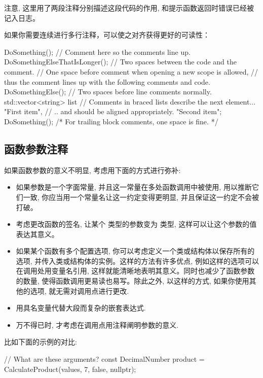 注意, 这里用了两段注释分别描述这段代码的作用, 和提示函数返回时错误已经被记入日志。

如果你需要连续进行多行注释，可以使之对齐获得更好的可读性：

\begin{cppcode}
DoSomething();                  // Comment here so the comments line up.
DoSomethingElseThatIsLonger();  // Two spaces between the code and the comment.
  { // One space before comment when opening a new scope is allowed,
    // thus the comment lines up with the following comments and code.
    DoSomethingElse();  // Two spaces before line comments normally.
  }
std::vector<string> list{
    // Comments in braced lists describe the next element...
    "First item",
    // .. and should be aligned appropriately.
    "Second item"};
DoSomething(); /* For trailing block comments, one space is fine. */
\end{cppcode}

\subsection{函数参数注释}

如果函数参数的意义不明显, 考虑用下面的方式进行弥补:

\begin{itemize}
  \item 如果参数是一个字面常量, 并且这一常量在多处函数调用中被使用, 用以推断它们一致, 你应当用一个常量名让这一约定变得更明显, 并且保证这一约定不会被打破。
  \item 考虑更改函数的签名, 让某个  类型的参数变为  类型, 这样可以让这个参数的值表达其意义。
  \item 如果某个函数有多个配置选项, 你可以考虑定义一个类或结构体以保存所有的选项, 并传入类或结构体的实例。这样的方法有许多优点, 例如这样的选项可以在调用处用变量名引用, 这样就能清晰地表明其意义。同时也减少了函数参数的数量, 使得函数调用更易读也易写。除此之外, 以这样的方式, 如果你使用其他的选项, 就无需对调用点进行更改.
  \item 用具名变量代替大段而复杂的嵌套表达式.
  \item 万不得已时, 才考虑在调用点用注释阐明参数的意义.
\end{itemize}

比如下面的示例的对比:

\begin{cppcode}
// What are these arguments?
const DecimalNumber product = CalculateProduct(values, 7, false, nullptr);
\end{cppcode}

